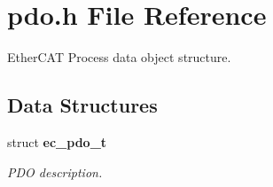\section{pdo.\-h \-File \-Reference}
\label{pdo_8h}


\-Ether\-C\-A\-T \-Process data object structure.  


\subsection*{\-Data \-Structures}
\begin{DoxyCompactItemize}
\item 
struct {\bf ec\-\_\-pdo\-\_\-t}
\begin{DoxyCompactList}\small\item\em \-P\-D\-O description. \end{DoxyCompactList}\end{DoxyCompactItemize}
